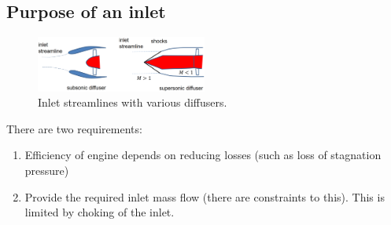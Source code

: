 \documentclass[class=report, crop=false, 12pt,a4paper]{standalone}
\begin{document}
\subsection{Purpose of an inlet}
\begin{figure}[H]
    \centering
    \includegraphics[width = 0.5\textwidth]{../img/diagram39.png}
    \caption{Inlet streamlines with various diffusers.}
\end{figure}
There are two requirements:
\begin{enumerate}
    \item Efficiency of engine depends on reducing losses (such as loss of stagnation pressure)
    \item Provide the required inlet mass flow (there are constraints to this). This is limited by choking of the inlet.
\end{enumerate}
\end{document}
